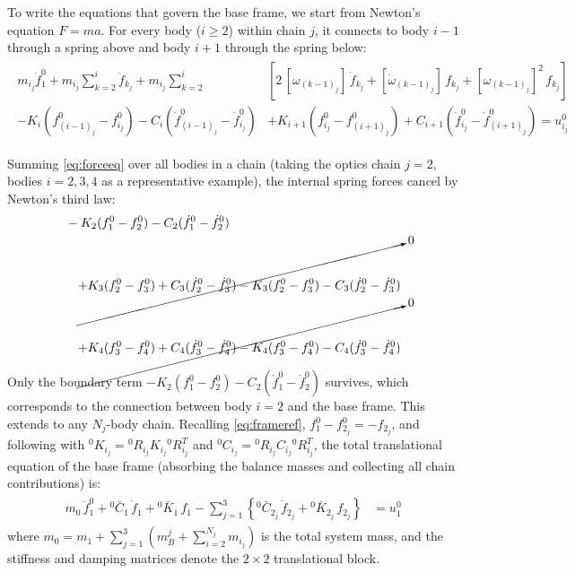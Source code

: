 To write the equations that govern the base frame, we start from Newton's equation $F = ma$. For every body ($i \geq 2$) within chain $j$, it connects to body $i-1$ through a spring above and body $i+1$ through the spring below:
\begin{align} \label{eq:forceeq}
    \begin{split}
        m_{i_j}\ddot{f}^{0}_{1}
        + m_{i_j}\sum^{i}_{k=2}\ddot{f}_{k_j}
        + m_{i_j}\sum^{i}_{k=2}
        &\left[
            2\,[\omega_{(k-1)_j}]\,\dot{f}_{k_j}
            + [\dot{\omega}_{(k-1)_j}]\,f_{k_j}
            + [\omega_{(k-1)_j}]^2\,f_{k_j}
        \right] \\
        - K_i\left( f^0_{{(i-1)}_j} - f^0_{{i}_j}\right)
        - C_i\left( \dot{f}^0_{{(i-1)}_j} - \dot{f}^0_{{i}_j}\right)
        &+ K_{i+1}\left( f^0_{{i}_j} - f^0_{{(i+1)}_j}\right)
        + C_{i+1}\left( \dot{f}^0_{{i}_j} - \dot{f}^0_{{(i+1)}_j}\right)
        = u^0_{i_j}
    \end{split}
\end{align}

Summing \eqref{eq:forceeq} over all bodies in a chain (taking the optics chain $j=2$, bodies $i=2,3,4$ as a representative example), the internal spring forces cancel by Newton's third law:
\begin{align}
    &- K_2(f^0_1 - f^0_2) - C_2(\dot{f}^0_1 - \dot{f}^0_2) \notag \\
    &\quad \cancelto{0}{
        + K_3(f^0_2 - f^0_3) + C_3(\dot{f}^0_2 - \dot{f}^0_3)
        - K_3(f^0_2 - f^0_3) - C_3(\dot{f}^0_2 - \dot{f}^0_3)
    } \notag \\
    &\quad \cancelto{0}{
        + K_4(f^0_3 - f^0_4) + C_4(\dot{f}^0_3 - \dot{f}^0_4)
        - K_4(f^0_3 - f^0_4) - C_4(\dot{f}^0_3 - \dot{f}^0_4)
    } \notag
\end{align}

Only the boundary term $- K_2(f^0_1 - f^0_2) - C_2(\dot{f}^0_1 - \dot{f}^0_2)$ survives, which corresponds to the connection between body $i = 2$ and the base frame. This extends to any $N_j$-body chain. Recalling \eqref{eq:frameref}, $f^{0}_{1} - f^{0}_{2_j} = -f_{2_j}$, and following \cite{Al-Rawashdeh2022_Caracterization} with ${}^0K_{i_j}={}^0R_{i_j} K_{i_j} {}^0R^T_{i_j}$ and ${}^0C_{i_j}={}^0R_{i_j} C_{i_j} {}^0R^T_{i_j}$, the total translational equation of the base frame (absorbing the balance masses and collecting all chain contributions) is:
\begin{align} \label{eq:baseframeeq}
    \begin{split}
        m_0\,\ddot{f}^{0}_{1}
        + {}^0\bar{C}_1\,\dot{f}_1
        + {}^0\bar{K}_1\,f_1
        - \sum_{j=1}^{3}\left\{
            {}^0\bar{C}_{2_j}\,\dot{f}_{2_j} + {}^0\bar{K}_{2_j}\,f_{2_j}
        \right\}
        &= u^0_{1}
    \end{split}
\end{align}
where $m_0 = m_{1} + \sum_{j=1}^{3}\!\left(m^j_{B} + \sum_{i=2}^{N_j} m_{i_j}\right)$ is the total system mass, and the stiffness and damping matrices denote the $2\times2$ translational block.

